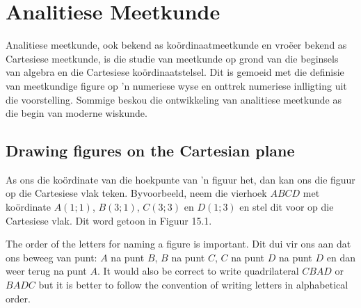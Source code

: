 \chapter{Analitiese Meetkunde}
Analitiese meetkunde, ook bekend as koördinaatmeetkunde en vroëer bekend as Cartesiese meetkunde, is die studie van meetkunde op grond van die beginsels van algebra en die Cartesiese koördinaatstelsel. Dit is gemoeid met die definisie van meetkundige figure op ’n numeriese wyse en onttrek numeriese inlligting uit die voorstelling. Sommige beskou die ontwikkeling van analitiese meetkunde as die begin van moderne wiskunde.\par 

\section{Drawing figures on the Cartesian plane}
As ons die koördinate van die hoekpunte van ’n figuur het, dan kan ons die figuur op die Cartesiese vlak teken.
Byvoorbeeld, neem die vierhoek $ABCD$ met koördinate $A(1;1)$, $B(3;1)$, $C(3;3)$ en $D(1;3)$ en stel dit voor op die
Cartesiese vlak. Dit word getoon in Figuur 15.1.\par 

\setcounter{subfigure}{0}
\begin{figure}[H] %
\begin{center}
\end{center}
\label{fig:cartesianplane}
\end{figure} 

The order of the letters for naming a figure is important. Dit dui vir ons aan dat ons beweeg van punt: $A$ na punt $B$, $B$ na punt $C$, $C$ na punt $D$ na punt $D$  en dan weer terug na punt  $A$. It would also be correct to write quadrilateral $CBAD$ or $BADC$ but it is better to follow the convention of writing letters in alphabetical order.     

